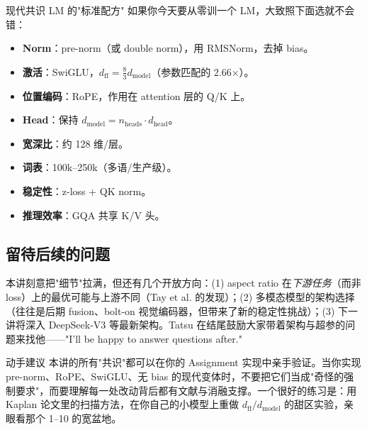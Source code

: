 \documentclass[a4paper]{article}
\begin{document}
\begin{importantbox}{现代共识 LM 的"标准配方"}
如果你今天要从零训一个 LM，大致照下面选就不会错：
\begin{itemize}
    \item \textbf{Norm}：pre-norm（或 double norm），用 RMSNorm，去掉 bias。
    \item \textbf{激活}：SwiGLU，$d_{\mathrm{ff}} = \tfrac{8}{3} d_{\mathrm{model}}$（参数匹配的 2.66×）。
    \item \textbf{位置编码}：RoPE，作用在 attention 层的 Q/K 上。
    \item \textbf{Head}：保持 $d_{\mathrm{model}} = n_{\mathrm{heads}} \cdot d_{\mathrm{head}}$。
    \item \textbf{宽深比}：约 128 维/层。
    \item \textbf{词表}：100k--250k（多语/生产级）。
    \item \textbf{稳定性}：z-loss + QK norm。
    \item \textbf{推理效率}：GQA 共享 K/V 头。
\end{itemize}
\end{importantbox}

\subsection{留待后续的问题}

本讲刻意把"细节"拉满，但还有几个开放方向：(1) aspect ratio 在\emph{下游任务}（而非 loss）上的最优可能与上游不同（Tay et al. 的发现）；(2) 多模态模型的架构选择（往往是后期 fusion、bolt-on 视觉编码器，但带来了新的稳定性挑战）；(3) 下一讲将深入 DeepSeek-V3 等最新架构。Tatsu 在结尾鼓励大家带着架构与超参的问题来找他——"I'll be happy to answer questions after."

\begin{practicebox}{动手建议}
本讲的所有"共识"都可以在你的 Assignment 实现中亲手验证。当你实现 pre-norm、RoPE、SwiGLU、无 bias 的现代变体时，不要把它们当成"奇怪的强制要求"，而要理解每一处改动背后都有文献与消融支撑。一个很好的练习是：用 Kaplan 论文里的扫描方法，在你自己的小模型上重做 $d_{\mathrm{ff}}/d_{\mathrm{model}}$ 的甜区实验，亲眼看那个 1--10 的宽盆地。
\end{practicebox}
\end{document}
